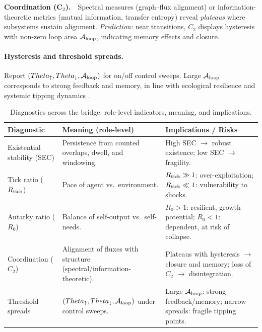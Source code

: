 \documentclass[12pt,a4paper,oneside]{scrreprt}
\def\Theta{Theta}%
\begin{document}
\textbf{Coordination (C$_2$).}\ \
Spectral measures (graph–flux alignment) or information-theoretic metrics (mutual information, transfer entropy) reveal \emph{plateaus} where subsystems sustain alignment. 
\emph{Prediction:} near transitions, $C_2$ displays hysteresis with non-zero loop area $\mathcal A_{\rm loop}$, indicating memory effects and closure.

\paragraph{Hysteresis and threshold spreads.}
Report $(\Theta_\uparrow,\Theta_\downarrow,\mathcal A_{\rm loop})$ for on/off control sweeps. 
Large $\mathcal A_{\rm loop}$ corresponds to strong feedback and memory, in line with ecological resilience \cite{Holling1973,Walker2004} and systemic tipping dynamics \cite{Scheffer2001,Lenton2008}.

\begin{table}[h!]
\centering
\caption{Diagnostics across the bridge: role-level indicators, meaning, and implications.}
\label{tab:bridge-diagnostics}
\begin{tabular}{p{3cm} p{6cm} p{5cm}}
\toprule
\textbf{Diagnostic} & \textbf{Meaning (role-level)} & \textbf{Implications / Risks} \\
\midrule
Existential stability (SEC) & Persistence from counted overlaps, dwell, and windowing. & High SEC $\rightarrow$ robust existence; low SEC $\rightarrow$ fragility. \\[0.4em]

Tick ratio ($R_{\rm tick}$) & Pace of agent vs.\ environment. & $R_{\rm tick}\gg 1$: over-exploitation; $R_{\rm tick}\ll 1$: vulnerability to shocks. \\[0.4em]

Autarky ratio ($R_0$) & Balance of self-output vs.\ self-needs. & $R_0>1$: resilient, growth potential; $R_0<1$: dependent, at risk of collapse. \\[0.4em]

Coordination ($C_2$) & Alignment of fluxes with structure (spectral/information-theoretic). & Plateaus with hysteresis $\rightarrow$ closure and memory; loss of $C_2$ $\rightarrow$ disintegration. \\[0.4em]

Threshold spreads & $(\Theta_\uparrow,\Theta_\downarrow,\mathcal A_{\rm loop})$ under control sweeps. & Large $\mathcal A_{\rm loop}$: strong feedback/memory; narrow spreads: fragile tipping points. \\
\bottomrule
\end{tabular}
\end{table}
\end{document}
